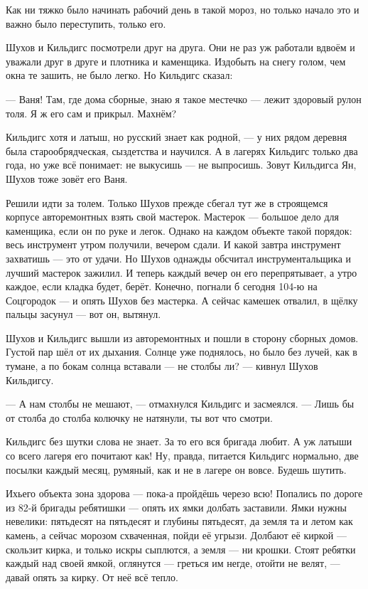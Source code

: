 Как ни тяжко было начинать рабочий день в такой мороз, но только начало это и важно было
переступить, только его.

Шухов и Кильдигс посмотрели друг на друга. Они не раз уж работали вдвоём и уважали друг в
друге и плотника и каменщика. Издобыть на снегу голом, чем окна те зашить, не было легко. Но
Кильдигс сказал:

--- Ваня! Там, где дома сборные, знаю я такое местечко --- лежит здоровый рулон толя. Я ж его сам и
прикрыл. Махнём?

Кильдигс хотя и латыш, но русский знает как родной, --- у них рядом деревня была
старообрядческая, сыздетства и научился. А в лагерях Кильдигс только два года, но уже всё
понимает: не выкусишь --- не выпросишь. Зовут Кильдигса Ян, Шухов тоже зовёт его Ваня.

Решили идти за толем. Только Шухов прежде сбегал тут же в строящемся корпусе авторемонтных
взять свой мастерок. Мастерок --- большое дело для каменщика, если он по руке и легок. Однако
на каждом объекте такой порядок: весь инструмент утром получили, вечером сдали. И какой
завтра инструмент захватишь --- это от удачи. Но Шухов однажды обсчитал инструментальщика и
лучший мастерок зажилил. И теперь каждый вечер он его перепрятывает, а утро каждое, если
кладка будет, берёт. Конечно, погнали б сегодня 104-ю на Соцгородок --- и опять Шухов без
мастерка. А сейчас камешек отвалил, в щёлку пальцы засунул --- вот он, вытянул.

Шухов и Кильдигс вышли из авторемонтных и пошли в сторону сборных домов. Густой пар шёл от их
дыхания. Солнце уже поднялось, но было без лучей, как в тумане, а по бокам солнца вставали ---
не столбы ли? --- кивнул Шухов Кильдигсу.

--- А нам столбы не мешают, --- отмахнулся Кильдигс и засмеялся. --- Лишь бы от столба до столба
колючку не натянули, ты вот что смотри.

Кильдигс без шутки слова не знает. За то его вся бригада любит. А уж латыши со всего лагеря
его почитают как! Ну, правда, питается Кильдигс нормально, две посылки каждый месяц, румяный,
как и не в лагере он вовсе. Будешь шутить.

Ихьего объекта зона здорова --- пока-а пройдёшь черезо всю! Попались по дороге из 82-й бригады
ребятишки --- опять их ямки долбать заставили. Ямки нужны невелики: пятьдесят на пятьдесят и
глубины пятьдесят, да земля та и летом как камень, а сейчас морозом схваченная, пойди её
угрызи. Долбают её киркой --- скользит кирка, и только искры сыплются, а земля --- ни крошки.
Стоят ребятки каждый над своей ямкой, оглянутся --- греться им негде, отойти не велят, --- давай
опять за кирку. От неё всё тепло.

